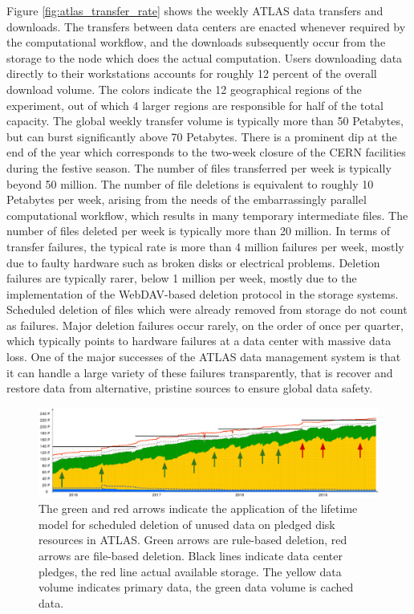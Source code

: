 \documentclass[11pt]{article}
\begin{document}
Figure \ref{fig:atlas_transfer_rate} shows the weekly ATLAS data transfers and downloads. The transfers between data centers are enacted whenever required by the computational workflow, and the downloads subsequently occur from the storage to the node which does the actual computation. Users downloading data directly to their workstations accounts for roughly 12 percent of the overall download volume. The colors indicate the 12 geographical regions of the experiment, out of which 4 larger regions are responsible for half of the total capacity. The global weekly transfer volume is typically more than 50 Petabytes, but can burst significantly above 70 Petabytes. There is a prominent dip at the end of the year which corresponds to the two-week closure of the CERN facilities during the festive season. The number of files transferred per week is typically beyond 50 million. The number of file deletions is equivalent to roughly 10 Petabytes per week, arising from the needs of the embarrassingly parallel computational workflow, which results in many temporary intermediate files. The number of files deleted per week is typically more than 20 million. In terms of transfer failures, the typical rate is more than 4 million failures per week, mostly due to faulty hardware such as broken disks or electrical problems. Deletion failures are typically rarer, below 1 million per week, mostly due to the implementation of the WebDAV-based deletion protocol in the storage systems. Scheduled deletion of files which were already removed from storage do not count as failures. Major deletion failures occur rarely, on the order of once per quarter, which typically points to hardware failures at a data center with massive data loss. One of the major successes of the ATLAS data management system is that it can handle a large variety of these failures transparently, that is recover and restore data from alternative, pristine sources to ensure global data safety.

\begin{figure}[t]
        \centering
        \includegraphics[width=\textwidth]{figs/lifetime_model.png}
        \caption{The green and red arrows indicate the application of the lifetime model for scheduled deletion of unused data on pledged disk resources in ATLAS. Green arrows are rule-based deletion, red arrows are file-based deletion. Black lines indicate data center pledges, the red line actual available storage. The yellow data volume indicates primary data, the green data volume is cached data.}
        \label{fig:lifetime_model}
\end{figure}
\end{document}
